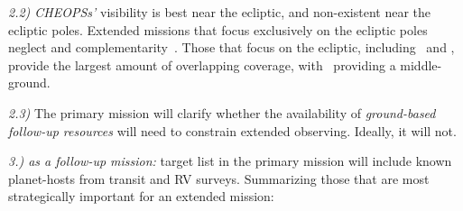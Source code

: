 \textit{2.2) CHEOPSs'} visibility is best near the ecliptic, and non-existent near the ecliptic poles.
Extended missions that focus exclusively on the ecliptic poles neglect \tess and \cheopss complementarity~\citep{berta_cheops_2016}.
Those that focus on the ecliptic, including \elong\ and \eshort, provide the largest amount of overlapping coverage, with \nhemi\ providing a middle-ground.

\textit{2.3)} %
The primary mission will clarify whether the availability of \textit{ground-based follow-up resources} will need to constrain \tesss extended observing.
Ideally, it will not.


\textit{3.) \tess as a follow-up mission:}
\tesss target list in the primary mission will include known planet-hosts from transit and RV surveys.
Summarizing those that are most strategically important for an extended mission:

